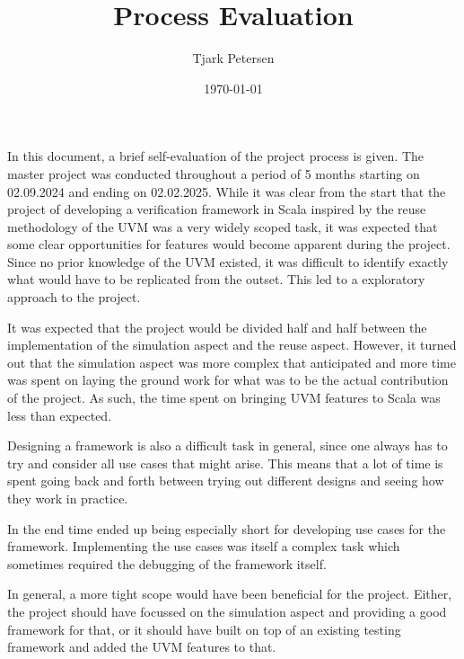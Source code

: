 \documentclass[11pt]{article}
\begin{document}
\title{{\Huge Process Evaluation}}
\author{Tjark Petersen}
\date{\today}

\maketitle
{}

In this document, a brief self-evaluation of the project process is given. The master project was conducted throughout a period of 5 months starting on 02.09.2024 and ending on 02.02.2025. While it was clear from the start that the project of developing a verification framework in Scala inspired by the reuse methodology of the UVM was a very widely scoped task, it was expected that some clear opportunities for features would become apparent during the project. Since no prior knowledge of the UVM existed, it was difficult to identify exactly what would have to be replicated from the outset. This led to a exploratory approach to the project. 

It was expected that the project would be divided half and half between the implementation of the simulation aspect and the reuse aspect. However, it turned out that the simulation aspect was more complex that anticipated and more time was spent on laying the ground work for what was to be the actual contribution of the project. As such, the time spent on bringing UVM features to Scala was less than expected. 

Designing a framework is also a difficult task in general, since one always has to try and consider all use cases that might arise. This means that a lot of time is spent going back and forth between trying out different designs and seeing how they work in practice. 

In the end time ended up being especially short for developing use cases for the framework. Implementing the use cases was itself a complex task which sometimes required the debugging of the framework itself. 

In general, a more tight scope would have been beneficial for the project. Either, the project should have focussed on the simulation aspect and providing a good framework for that, or it should have built on top of an existing testing framework and added the UVM features to that.
\end{document}
